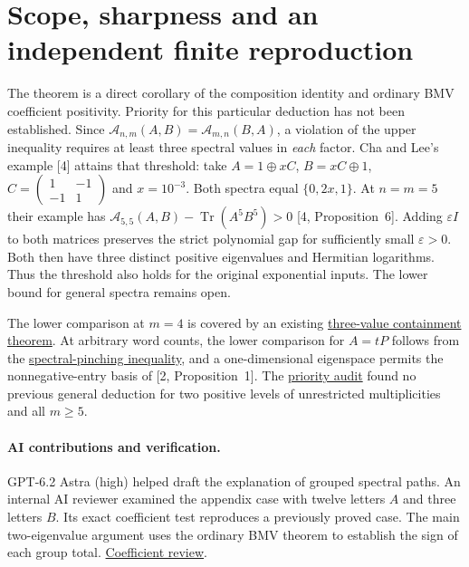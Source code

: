 \documentclass[11pt]{article}
\newcommand{\tr}{\operatorname{Tr}}
\begin{document}
\section*{Scope, sharpness and an independent finite reproduction}
The theorem is a direct corollary of the composition identity and ordinary
BMV coefficient positivity. Priority for this particular deduction has
not been established. Since $\mathcal A_{n,m}(A,B)=\mathcal A_{m,n}(B,A)$,
a violation of the upper inequality requires at least three spectral values
in \emph{each} factor. Cha and Lee's example [4] attains that threshold:
take $A=1\oplus xC$, $B=xC\oplus1$,
$C=\left(\begin{smallmatrix}1&-1\\-1&1\end{smallmatrix}\right)$ and
$x=10^{-3}$. Both spectra equal $\{0,2x,1\}$. At $n=m=5$ their example
has $\mathcal A_{5,5}(A,B)-\tr(A^5B^5)>0$ [4, Proposition~6].
Adding $\varepsilon I$ to both matrices preserves the strict polynomial
gap for sufficiently small $\varepsilon>0$. Both then have three distinct
positive eigenvalues and Hermitian logarithms. Thus the threshold also
holds for the original exponential inputs.
The lower bound for general spectra remains open.

The lower comparison at $m=4$ is covered by an existing
\href{https://github.com/the-omega-institute/trureturing/blob/c1938e29dc5ffac04e065367b179487fb4cd9744/Blueprint/D5/S3/Quantum/Analysis/RefinedBMV/SingularFourth/ZeroSpectrumProduct.md}{three-value containment theorem}.
At arbitrary word counts, the lower comparison for $A=tP$ follows from the
\href{https://arxiv.org/abs/2610.31851}{spectral-pinching inequality}, and a one-dimensional eigenspace permits the nonnegative-entry basis of [2, Proposition~1]. The
\href{https://github.com/shunyaekam/oo-research/blob/research/discovery/sources/bmv-block-priority.md}{priority audit} found no previous general deduction for two positive levels of unrestricted multiplicities and all $m\ge5$.

\paragraph{AI contributions and verification.} GPT-6.2 Astra (high) helped draft the explanation of grouped spectral paths. An internal AI reviewer examined the appendix case with twelve letters $A$ and three letters $B$. Its exact coefficient test reproduces a previously proved case. The main two-eigenvalue argument uses the ordinary BMV theorem to establish the sign of each group total. \href{https://github.com/shunyaekam/oo-research/blob/a5cde30636afbfe599efab6bf8bbbafe9c640c22/checks/bmv-review.md}{Coefficient review}.
\end{document}
